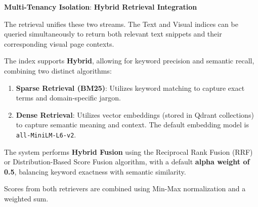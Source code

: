 \begin{table}[H]
\centering
\caption[Hybrid Storage Architecture]{Local vs. Cloud storage division of responsibility.}
\label{tab:storage_architecture}
\end{table}

\textbf{Multi-Tenancy Isolation}:
\textbf{Hybrid Retrieval Integration}

The retrieval unifies these two streams. 
The Text and Visual indices can be queried simultaneously to return both relevant text snippets and their corresponding visual page contexts.

The index supports \textbf{Hybrid}, allowing for keyword precision and semantic recall, combining two distinct algorithms:

\begin{enumerate}
    \item \textbf{Sparse Retrieval (BM25)}: Utilizes keyword matching to capture exact terms and domain-specific jargon.
    \item \textbf{Dense Retrieval}: Utilizes vector embeddings (stored in Qdrant collections) to capture semantic meaning and context. The default embedding model is \texttt{all-MiniLM-L6-v2}.
\end{enumerate}

The system performs \textbf{Hybrid Fusion} using the Reciprocal Rank Fusion (RRF) or Distribution-Based Score Fusion algorithm, with a default \textbf{alpha weight of 0.5}, balancing keyword exactness with semantic similarity.

Scores from both retrievers are combined using Min-Max normalization and a weighted sum.




